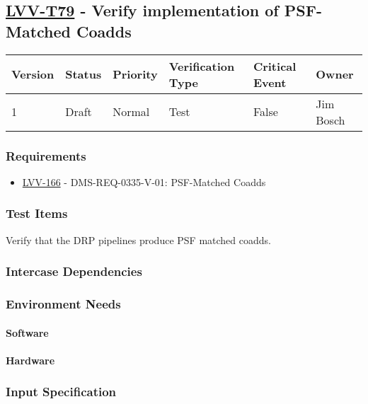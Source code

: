 \subsection{\href{https://jira.lsstcorp.org/secure/Tests.jspa\#/testCase/LVV-T79}{LVV-T79}
    - Verify implementation of PSF-Matched Coadds}\label{lvv-t79}

\begin{longtable}[]{llllll}
\toprule
Version & Status & Priority & Verification Type & Critical Event & Owner
\\\midrule
1 & Draft & Normal &
Test & False & Jim Bosch
\\\bottomrule
\end{longtable}

\subsubsection{Requirements}
\begin{itemize}
\item \href{https://jira.lsstcorp.org/browse/LVV-166}{LVV-166} - DMS-REQ-0335-V-01: PSF-Matched Coadds
\end{itemize}

\subsubsection{Test Items}
Verify that the DRP pipelines produce PSF matched coadds.



\subsubsection{Intercase Dependencies}

\subsubsection{Environment Needs}

\paragraph{Software}

\paragraph{Hardware}

\subsubsection{Input Specification}


